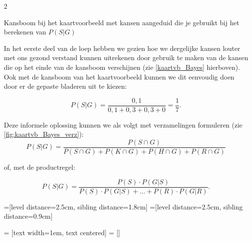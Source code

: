\begin{multicols} {2}
\begin{afbeeldingenv}
\caption{Kansboom bij het kaartvoorbeeld met kansen aangeduid die je gebruikt bij het berekenen van $P(S|G)$}
\label{kaartvb_Bayes}
\end{afbeeldingenv}

In het eerste deel van de loep hebben we gezien hoe we dergelijke kansen louter met ons gezond verstand kunnen uitrekenen door gebruik te maken van de kansen die op het einde van de kansboom verschijnen (zie \autoref{kaartvb_Bayes} hierboven). Ook met de kansboom van het kaartvoorbeeld kunnen we dit eenvoudig doen door er de gepaste bladeren uit te kiezen:

\vspace{0.3cm}
$$P(S|G)=\frac{0,1}{0,1+0,3+0,3+0}=\frac{1}{7}.$$
\vspace{0.3cm}


Deze informele oplossing kunnen we als volgt met verzamelingen formuleren (zie \autoref{fig:kaartvb_Bayes_verz}):
\vspace{0.3cm}
$$P(S|G)=\frac {P(S \cap G)} {P(S\cap G)+P(K \cap G)+P(H \cap G)+P(R \cap G)}$$
\vspace{0.3cm}

of, met de productregel:

\vspace{0.3cm}
$$P(S|G)=\frac {P(S) \cdot P(G|S)} {P(S) \cdot P(G|S)+...+P(R) \cdot P(G|R)}.$$
\vspace{0.3cm}

=[level distance=2.5cm, sibling distance=1.8cm]
=[level distance=2.5cm, sibling distance=0.9cm]

 = [text width=1em, text centered]
 = []


\end{multicols}
